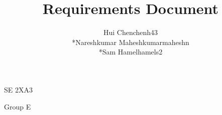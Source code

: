 \documentclass[12pt]{article}
\begin{document}
	\begin{titlepage}
	\title {Requirements Document}
	\maketitle
		\begin{center}
		SE 2XA3\\
		\author{
		Hui Chen\hspace{128pt}chenh43	
		\\*Nareshkumar Maheshkumar\hspace{35pt}maheshn 
		\\*Sam Hamel\hspace{118pt}hamels2 \\
		}

		Group E
		\end{center}
	\end{titlepage}
	
	\newpage
\end{document}
